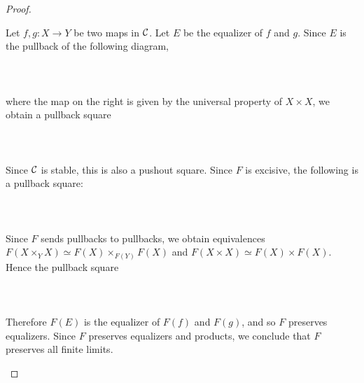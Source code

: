 \documentclass[a4paper]{article}
\begin{document}
\begin{prp}{}{}
\begin{proof}
\begin{itemize}
Let $f,g:X\to Y$ be two maps in $\mathcal{C}$. Let $E$ be the equalizer of $f$ and $g$. Since $E$ is the pullback of the following diagram, \\~\\
\\~\\
where the map on the right is given by the universal property of $X\times X$, we obtain a pullback square \\~\\
\\~\\
Since $\mathcal{C}$ is stable, this is also a pushout square. Since $F$ is excisive, the following is a pullback square: \\~\\
\\~\\
Since $F$ sends pullbacks to pullbacks, we obtain equivalences $F(X\times_YX)\simeq F(X)\times_{F(Y)}F(X)$ and $F(X\times X)\simeq F(X)\times F(X)$. Hence the pullback square \\~\\
\\~\\
Therefore $F(E)$ is the equalizer of $F(f)$ and $F(g)$, and so $F$ preserves equalizers. Since $F$ preserves equalizers and products, we conclude that $F$ preserves all finite limits. 
\end{itemize}
\end{proof}
\end{prp}
\end{document}
